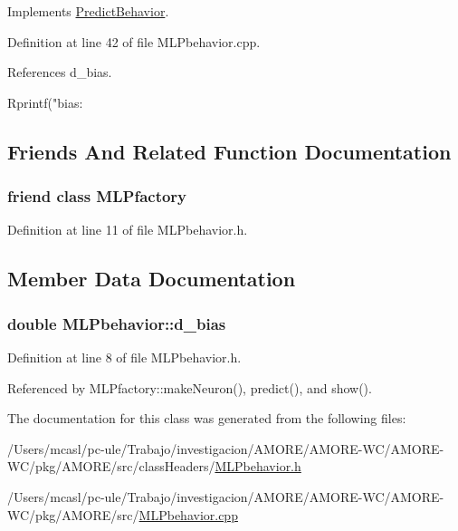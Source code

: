 Implements \hyperlink{class_predict_behavior_a9ef84360f73784248d994fa4707c1dde}{PredictBehavior}.



Definition at line 42 of file MLPbehavior.cpp.



References d\_\-bias.


\begin{DoxyCode}
{
  Rprintf("\n bias: %
}
\end{DoxyCode}


\subsection{Friends And Related Function Documentation}
\hypertarget{class_m_l_pbehavior_a1aa48940238b9487734e590ffab33a1b}{
\subsubsection[{MLPfactory}]{\setlength{\rightskip}{0pt plus 5cm}friend class {\bf MLPfactory}}}
\label{class_m_l_pbehavior_a1aa48940238b9487734e590ffab33a1b}


Definition at line 11 of file MLPbehavior.h.



\subsection{Member Data Documentation}
\hypertarget{class_m_l_pbehavior_a6206785c5c3f838a0538f9f77fa7a25a}{
\subsubsection[{d\_\-bias}]{\setlength{\rightskip}{0pt plus 5cm}double {\bf MLPbehavior::d\_\-bias}}}
\label{class_m_l_pbehavior_a6206785c5c3f838a0538f9f77fa7a25a}


Definition at line 8 of file MLPbehavior.h.



Referenced by MLPfactory::makeNeuron(), predict(), and show().



The documentation for this class was generated from the following files:\begin{DoxyCompactItemize}
\item 
/Users/mcasl/pc-\/ule/Trabajo/investigacion/AMORE/AMORE-\/WC/AMORE-\/WC/pkg/AMORE/src/classHeaders/\hyperlink{_m_l_pbehavior_8h}{MLPbehavior.h}\item 
/Users/mcasl/pc-\/ule/Trabajo/investigacion/AMORE/AMORE-\/WC/AMORE-\/WC/pkg/AMORE/src/\hyperlink{_m_l_pbehavior_8cpp}{MLPbehavior.cpp}\end{DoxyCompactItemize}
